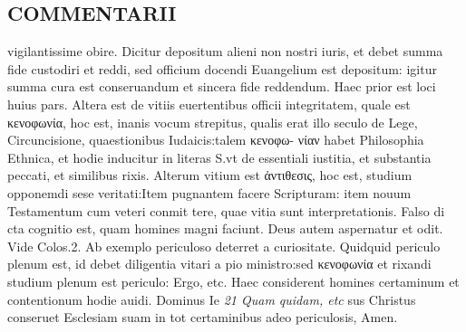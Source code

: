 \documentclass{article}
\begin{document}
\begin{pages}
\section*{COMMENTARII }
\marginpar{[ p.170 ]}\pstart vigilantissime obire. Dicitur depositum alieni non nostri iuris, et debet summa fide custodiri et reddi, sed officium docendi Euangelium est depositum: igitur summa cura est conseruandum et sincera fide reddendum. Haec prior est loci huius pars. Altera est de vitiis euertentibus officii integritatem, quale est κενοφωνία, hoc est, inanis vocum strepitus, qualis erat illo seculo de Lege, Circuncisione, quaestionibus Iudaicis:talem κενοφω- νίαν habet Philosophia Ethnica, et hodie inducitur in literas S.vt de essentiali iustitia, et substantia peccati, et similibus rixis. Alterum vitium est ἀντιθεσις, hoc est, studium opponemdi sese veritati:Item pugnantem facere Scripturam: item nouum Testamentum cum veteri conmit tere, quae vitia sunt interpretationis. Falso di cta cognitio est, quam homines magni faciunt. Deus autem aspernatur et odit. Vide Colos.2. Ab exemplo periculoso deterret a curiositate. Quidquid periculo plenum est, id debet diligentia vitari a pio ministro:sed κενοφωνία et rixandi studium plenum est periculo: Ergo, etc. Haec considerent homines certaminum et contentionum hodie auidi. Dominus Ie\pend
\textit{21 Quam quidam, etc }\pstart sus Christus conseruet Esclesiam suam in tot certaminibus adeo periculosis, Amen.  \pend
\end{pages}
\end{document}
